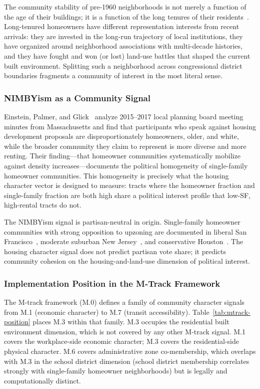 The community stability of pre-1960 neighborhoods is not merely a function
of the age of their buildings; it is a function of the long tenures of their
residents~\citep{weaver2020}.
Long-tenured homeowners have different representation interests from recent
arrivals: they are invested in the long-run trajectory of local institutions,
they have organized around neighborhood associations with multi-decade histories,
and they have fought and won (or lost) land-use battles that shaped the
current built environment.
Splitting such a neighborhood across congressional district boundaries fragments
a community of interest in the most literal sense.

\subsubsection{NIMBYism as a Community Signal}

Einstein, Palmer, and Glick~\citeyearpar{einstein2019} analyze 2015--2017
local planning board meeting minutes from Massachusetts and find that
participants who speak against housing development proposals are disproportionately
homeowners, older, and white, while the broader community they claim to represent
is more diverse and more renting.
Their finding---that homeowner communities systematically mobilize against
density increases---documents the political homogeneity of single-family
homeowner communities.
This homogeneity is precisely what the housing character vector is designed
to measure: tracts where the homeowner fraction and single-family fraction
are both high share a political interest profile that low-SF, high-rental
tracts do not.

The NIMBYism signal is partisan-neutral in origin.
Single-family homeowner communities with strong opposition to upzoning
are documented in liberal San Francisco~\citep{einstein2019},
moderate suburban New Jersey~\citep{fischel2001}, and conservative
Houston~\citep{nolo2022zoning}.
The housing character signal does not predict partisan vote share;
it predicts community cohesion on the housing-and-land-use dimension
of political interest.

\subsubsection{Implementation Position in the M-Track Framework}

The M-track framework (M.0) defines a family of community character signals
from M.1 (economic character) to M.7 (transit accessibility).
Table~\ref{tab:mtrack-position} places M.3 within that family.
M.3 occupies the residential built environment dimension, which is not covered
by any other M-track signal.
M.1 covers the workplace-side economic character; M.3 covers the residential-side
physical character.
M.6 covers administrative zone co-membership, which overlaps with M.3 in the
school district dimension (school district membership correlates strongly with
single-family homeowner neighborhoods) but is legally and computationally
distinct.


